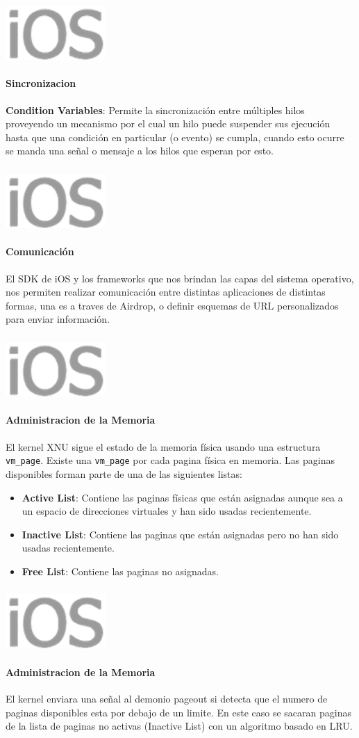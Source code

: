 \documentclass{beamer}
\newcommand*{\ioslogo}{\includegraphics[scale=0.25]{img/logo2.png} \ }%
\begin{document}
\begin{frame}
\frametitle{\ioslogo}
\framesubtitle{Sincronizacion}
	
	\textbf{Condition Variables}: Permite la sincronización entre múltiples hilos proveyendo un mecanismo por el cual un hilo puede suspender sus ejecución hasta que una condición en particular (o evento) se cumpla, cuando esto ocurre se manda una señal o mensaje a los hilos que esperan por esto.
\end{frame}



\begin{frame}
\frametitle{\ioslogo}
\framesubtitle{Comunicación}
	El SDK de iOS y los frameworks que nos brindan las capas del sistema operativo, nos permiten realizar comunicación entre distintas aplicaciones de distintas formas, una es a traves de Airdrop, o definir esquemas de URL personalizados para enviar información.
\end{frame}



\begin{frame}
\frametitle{\ioslogo}
\framesubtitle{Administracion de la Memoria}
	
	El kernel XNU sigue el estado de la memoria física usando una estructura \texttt{vm\_page}. Existe una \texttt{vm\_page} por cada pagina física en memoria. Las paginas disponibles forman parte de una de las siguientes listas:
	
	\begin{itemize}
		\item \textbf{Active List}: Contiene las paginas físicas que están asignadas aunque sea a un espacio de direcciones virtuales y han sido usadas recientemente.
		
		\item \textbf{Inactive List}: Contiene las paginas que están asignadas pero no han sido usadas recientemente.
		
		\item \textbf{Free List}: Contiene las paginas no asignadas.
	\end{itemize}
\end{frame}

\begin{frame}
\frametitle{\ioslogo}
\framesubtitle{Administracion de la Memoria}

	El kernel enviara una señal al demonio pageout si detecta que el numero de paginas disponibles esta por debajo de un limite. En este caso se sacaran paginas de la lista de paginas no activas (Inactive List) con un algoritmo basado en LRU.
\end{frame}
\end{document}
